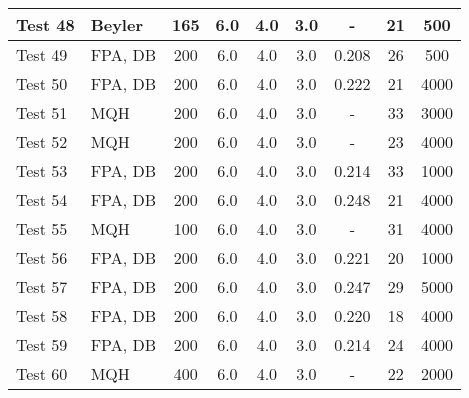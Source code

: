 \begin{table}[!ht]
\begin{center}
\begin{tabular}{|l|l|c|c|c|c|c|c|c|}
Test 48    &  Beyler            &  165            &  6.0       &  4.0       &  3.0       &  -              &  21                    &  500               \\ \hline
Test 49    &  FPA, DB           &  200            &  6.0       &  4.0       &  3.0       &  0.208          &  26                    &  500               \\ \hline
Test 50    &  FPA, DB           &  200            &  6.0       &  4.0       &  3.0       &  0.222          &  21                    &  4000              \\ \hline
Test 51    &  MQH               &  200            &  6.0       &  4.0       &  3.0       &  -              &  33                    &  3000              \\ \hline
Test 52    &  MQH               &  200            &  6.0       &  4.0       &  3.0       &  -              &  23                    &  4000              \\ \hline
Test 53    &  FPA, DB           &  200            &  6.0       &  4.0       &  3.0       &  0.214          &  33                    &  1000              \\ \hline
Test 54    &  FPA, DB           &  200            &  6.0       &  4.0       &  3.0       &  0.248          &  21                    &  4000              \\ \hline
Test 55    &  MQH               &  100            &  6.0       &  4.0       &  3.0       &  -              &  31                    &  4000              \\ \hline
Test 56    &  FPA, DB           &  200            &  6.0       &  4.0       &  3.0       &  0.221          &  20                    &  1000              \\ \hline
Test 57    &  FPA, DB           &  200            &  6.0       &  4.0       &  3.0       &  0.247          &  29                    &  5000              \\ \hline
Test 58    &  FPA, DB           &  200            &  6.0       &  4.0       &  3.0       &  0.220          &  18                    &  4000              \\ \hline
Test 59    &  FPA, DB           &  200            &  6.0       &  4.0       &  3.0       &  0.214          &  24                    &  4000              \\ \hline
Test 60    &  MQH               &  400            &  6.0       &  4.0       &  3.0       &  -              &  22                    &  2000              \\ \hline

\end{tabular}
\end{center}
\end{table}
